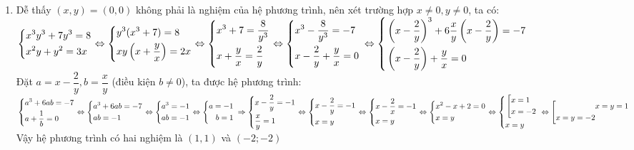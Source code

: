 \begin{ex}
{\begin{enumerate}
        Vậy phương trình có hai nghiệm $x=-1, x=0$
        \item Dễ thấy $(x,y)=(0,0)$ không phải là nghiệm của hệ phương trình, nên xét trường hợp $x\neq 0, y\neq 0$, ta có: \\
        $\left\{\begin{aligned}&x^3y^3+7y^3=8\\&x^2y+y^2=3x\end{aligned}\right.\Leftrightarrow \left\{\begin{aligned}&y^3(x^3+7)=8\\&xy\left(x+\dfrac{y}{x}\right)=2x\end{aligned}\right.\Leftrightarrow \left\{\begin{aligned}&x^3+7=\dfrac{8}{y^3}\\&x+\dfrac{y}{x}=\dfrac{2}{y}\end{aligned}\right.\Leftrightarrow \left\{\begin{aligned}&x^3-\dfrac{8}{y^3}=-7\\&x-\dfrac{2}{y}+\dfrac{y}{x}=0\end{aligned}\right.\\ \Leftrightarrow \left\{\begin{aligned}&\left(x-\dfrac{2}{y}\right)^3+6\dfrac{x}{y}\left(x-\dfrac{2}{y}\right)=-7\\&\left(x-\dfrac{2}{y}\right)+\dfrac{y}{x}=0\end{aligned}\right.$\\
        Đặt $a=x-\dfrac{2}{y}, b=\dfrac{x}{y}$ (điều kiện $b\neq 0$), ta được hệ phương trình:\\
        $\left\{\begin{aligned}&a^3+6ab=-7\\&a+\dfrac{1}{b}=0\end{aligned}\right.\Leftrightarrow \left\{\begin{aligned}&a^3+6ab=-7\\&ab=-1\end{aligned}\right.\Leftrightarrow \left\{\begin{aligned}&a^3=-1\\&ab=-1\end{aligned}\right.\Leftrightarrow \left\{\begin{aligned}a=-1\\b=1\end{aligned}\right.\\ \Rightarrow \left\{\begin{aligned}&x-\dfrac{2}{y}=-1\\&\dfrac{x}{y}=1\end{aligned}\right.\Leftrightarrow \left\{\begin{aligned}&x-\dfrac{2}{y}=-1\\&x=y\end{aligned}\right.\Leftrightarrow \left\{\begin{aligned}&x-\dfrac{2}{x}=-1\\&x=y\end{aligned}\right.\Leftrightarrow \left\{\begin{aligned}&x^2-x+2=0\\&x=y\end{aligned}\right.\Leftrightarrow \left\{\begin{aligned}&\left[\begin{aligned}&x=1\\&x=-2\end{aligned}\right.\\&x=y\end{aligned}\right.\\ \Leftrightarrow \left[\begin{aligned}&x=y=1\\x=y=-2\end{aligned}\right.$\\
        Vậy hệ phương trình có hai nghiệm là $(1,1)$ và $(-2;-2)$
    \end{enumerate}
    }
\end{ex}

